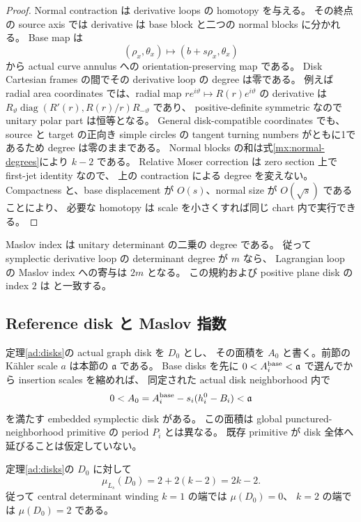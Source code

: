 \begin{proof}
Normal contraction は derivative loops の homotopy を与える。
その終点の source axis では derivative は base block と二つの normal blocks に分かれる。
Base map は
\[
 (\rho_x,\theta_x)\longmapsto (b+s\rho_x,\theta_x)
\]
から actual curve annulus への orientation-preserving map である。
Disk Cartesian frames の間でその derivative loop の degree は零である。
例えば radial area coordinates では、radial map
$re^{i\vartheta}\mapsto R(r)e^{i\vartheta}$ の derivative は
$R_\vartheta\operatorname{diag}(R'(r),R(r)/r)R_{-\vartheta}$ であり、
positive-definite symmetric なので unitary polar part は恒等となる。
General disk-compatible coordinates でも、source と target の正向き simple circles の
tangent turning numbers がともに1であるため degree は零のままである。
Normal blocks の和は式\eqref{mx:normal-degrees}により $k-2$ である。
Relative Moser correction は zero section 上で first-jet identity なので、
上の contraction による degree を変えない。
Compactness と、base displacement が $O(s)$、normal size が $O(\sqrt s)$ であることにより、
必要な homotopy は scale を小さくすれば同じ chart 内で実行できる。
\end{proof}

Maslov index は unitary determinant の二乗の degree である。
従って symplectic derivative loop の determinant degree が $m$ なら、
Lagrangian loop の Maslov index への寄与は $2m$ となる。
この規約および positive plane disk の index $2$ は
\cite[\S2.3, Example 2.10, Theorem 3.1]{cho-shin-maslov}と一致する。

\subsection{Reference disk と Maslov 指数}

定理\ref{ad:disks}の actual graph disk を $D_0$ とし、
その面積を $A_0$ と書く。前節の Kähler scale $a$ は本節の $\mathfrak a$ である。
Base disks を先に $0<A_i^{\rm base}<\mathfrak a$ で選んでから insertion scales を縮めれば、
同定された actual disk neighborhood 内で
\begin{equation}\label{mx:small-area}
 0<A_0=A_i^{\rm base}-s_i(h_i^0-B_i)<\mathfrak a
\end{equation}
を満たす embedded symplectic disk がある。
この面積は global punctured-neighborhood primitive の period $P_i$ とは異なる。
既存 primitive が disk 全体へ延びることは仮定していない。

\begin{proposition}\label{mx:index}
定理\ref{ad:disks}の $D_0$ に対して
\begin{equation}\label{mx:maslov-value}
 \mu_{L_s}(D_0)=2+2(k-2)=2k-2.
\end{equation}
従って central determinant winding $k=1$ の端では $\mu(D_0)=0$、
$k=2$ の端では $\mu(D_0)=2$ である。
\end{proposition}

